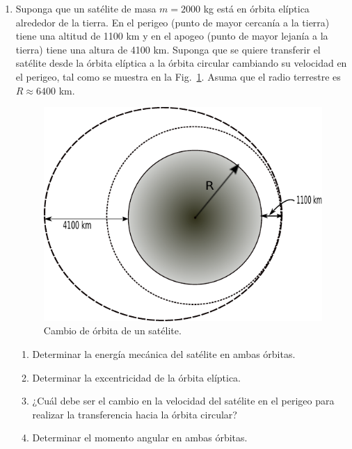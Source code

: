 \begin{enumerate}
\vspace{0.5 cm}
\item Suponga que un satélite de masa $m=2000$ kg está en órbita elíptica alrededor de la tierra.
En el perigeo (punto de mayor cercanía a la tierra) tiene una altitud de 1100 km y en el apogeo (punto de mayor lejanía a la tierra) tiene una altura de 4100 km. 
Suponga que se quiere transferir el satélite desde la órbita elíptica a la órbita circular 
cambiando su velocidad en el perigeo, tal como se muestra en la Fig.~\ref{fig:cambio-orbita}. 
Asuma que el radio terrestre es $R\approx 6400$ km. 
%
\begin{figure}[h]
\begin{center}
\includegraphics[scale=0.8]{gravitacion/cambio-de-orbita}
\end{center}
\caption{Cambio de órbita de un satélite.}
\label{fig:cambio-orbita}
\end{figure}
%
\begin{enumerate}
\item Determinar la energía mecánica del satélite en ambas órbitas.
\item Determinar la excentricidad de la órbita elíptica.
\item ¿Cuál debe ser el cambio en la velocidad del satélite en el perigeo para realizar la transferencia hacia la órbita circular?
\item Determinar el momento angular en ambas órbitas.
\end{enumerate}


\end{enumerate}
